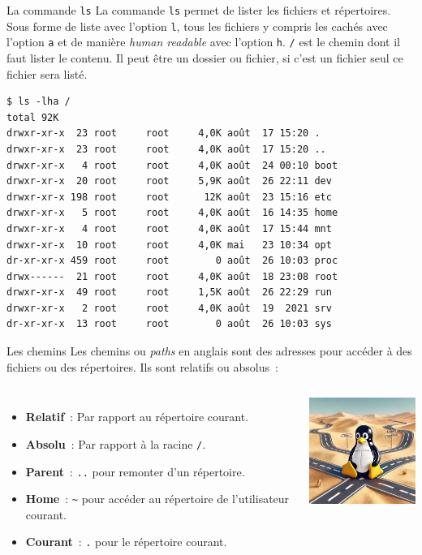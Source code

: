 \documentclass{beamer}
\begin{document}
    \begin{frame}[fragile]{La commande \lstinline{ls}}
        La commande \lstinline{ls} permet de lister les fichiers et répertoires.
        Sous forme de liste avec l'option \lstinline{l}, tous les fichiers y compris les cachés avec l'option \lstinline{a} et de manière \textit{human readable} avec l'option \lstinline{h}.
        \lstinline{/} est le chemin dont il faut lister le contenu.
        Il peut être un dossier ou fichier, si c'est un fichier seul ce fichier sera listé.
        \begin{lstlisting}
$ ls -lha /
total 92K
drwxr-xr-x  23 root     root     4,0K août  17 15:20 .
drwxr-xr-x  23 root     root     4,0K août  17 15:20 ..
drwxr-xr-x   4 root     root     4,0K août  24 00:10 boot
drwxr-xr-x  20 root     root     5,9K août  26 22:11 dev
drwxr-xr-x 198 root     root      12K août  23 15:16 etc
drwxr-xr-x   5 root     root     4,0K août  16 14:35 home
drwxr-xr-x   4 root     root     4,0K août  17 15:44 mnt
drwxr-xr-x  10 root     root     4,0K mai   23 10:34 opt
dr-xr-xr-x 459 root     root        0 août  26 10:03 proc
drwx------  21 root     root     4,0K août  18 23:08 root
drwxr-xr-x  49 root     root     1,5K août  26 22:29 run
drwxr-xr-x   2 root     root     4,0K août  19  2021 srv
dr-xr-xr-x  13 root     root        0 août  26 10:03 sys
        \end{lstlisting}
    \end{frame}

    \begin{frame}[fragile]{Les chemins}
        Les chemins ou \textit{paths} en anglais sont des adresses pour accéder à des fichiers ou des répertoires.
        Ils sont relatifs ou absolus~:
        \bigbreak
        \begin{columns}
            \begin{itemize}
                \item \textbf{Relatif}~: Par rapport au répertoire courant.
                \item \textbf{Absolu}~: Par rapport à la racine \lstinline{/}.
                \item \textbf{Parent}~: \lstinline{..} pour remonter d'un répertoire.
                \item \textbf{Home}~: \lstinline{~} pour accéder au répertoire de l'utilisateur courant.
                \item \textbf{Courant}~: \lstinline{.} pour le répertoire courant.
            \end{itemize}
            \centering
            \includegraphics[width=4cm]{image/tux-path}
        \end{columns}
    \end{frame}
\end{document}
